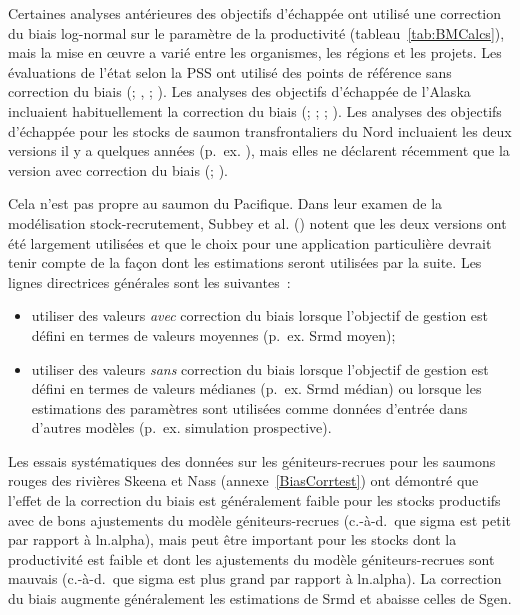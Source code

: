 \documentclass[french,11pt]{book}
\begin{document}
Certaines analyses antérieures des objectifs d'échappée ont utilisé une correction du biais log-normal sur le paramètre de la productivité (tableau~\ref{tab:BMCalcs}), mais la mise en œuvre a varié entre les organismes, les régions et les projets. Les évaluations de l'état selon la PSS ont utilisé des points de référence sans correction du biais (; , ; ). Les analyses des objectifs d'échappée de l'Alaska incluaient habituellement la correction du biais (; ; ; ). Les analyses des objectifs d'échappée pour les stocks de saumon transfrontaliers du Nord incluaient les deux versions il y a quelques années (p.~ex. ), mais elles ne déclarent récemment que la version avec correction du biais (; ).

Cela n'est pas propre au saumon du Pacifique. Dans leur examen de la modélisation stock-recrutement, Subbey et al. () notent que les deux versions ont été largement utilisées et que le choix pour une application particulière devrait tenir compte de la façon dont les estimations seront utilisées par la suite. Les lignes directrices générales sont les suivantes~:
\begin{itemize}

\item
  utiliser des valeurs \emph{avec} correction du biais lorsque l'objectif de gestion est défini en termes de valeurs moyennes (p.~ex. Srmd moyen);
\item
  utiliser des valeurs \emph{sans} correction du biais lorsque l'objectif de gestion est défini en termes de valeurs médianes (p.~ex. Srmd médian) ou lorsque les estimations des paramètres sont utilisées comme données d'entrée dans d'autres modèles (p.~ex. simulation prospective).
\end{itemize}
Les essais systématiques des données sur les géniteurs-recrues pour les saumons rouges des rivières Skeena et Nass (annexe~\ref{BiasCorrtest}) ont démontré que l'effet de la correction du biais est généralement faible pour les stocks productifs avec de bons ajustements du modèle géniteurs-recrues (c.-à-d.~que sigma est petit par rapport à ln.alpha), mais peut être important pour les stocks dont la productivité est faible et dont les ajustements du modèle géniteurs-recrues sont mauvais (c.-à-d.~que sigma est plus grand par rapport à ln.alpha). La correction du biais augmente généralement les estimations de Srmd et abaisse celles de Sgen.
\end{document}
